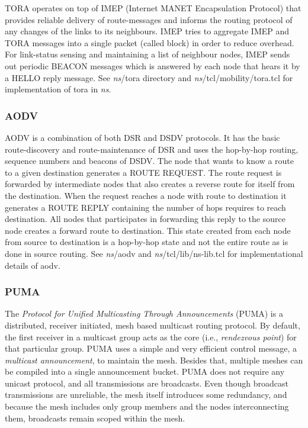 TORA operates on top of IMEP (Internet MANET Encapsulation Protocol) that
provides reliable delivery of route-messages and informs the routing
protocol of any changes of the links to its neighbours. IMEP tries to
aggregate IMEP and TORA messages into a single packet (called block) in
order to reduce overhead. For link-status sensing and maintaining a list
of neighbour nodes, IMEP sends out periodic BEACON messages which is
answered by each node that hears it by a HELLO reply message.
See \emph{ns}/tora directory and \emph{ns}/tcl/mobility/tora.tcl for implementation of
tora in \emph{ns}.

\subsubsection{AODV}
\label{sec:AODV}

AODV is a combination of both DSR and DSDV protocols. It has the basic
route-discovery and route-maintenance of DSR and uses the hop-by-hop
routing, sequence numbers and beacons of DSDV. The node that wants to know
a route to a given destination generates a ROUTE REQUEST. The route
request is forwarded by intermediate nodes that also creates a reverse
route for itself from the destination. When the request reaches a node
with route to destination it generates a ROUTE REPLY containing the number
of hops requires to reach destination. All nodes that participates in
forwarding this reply to the source node creates a forward route to
destination. This state created from each node from source to destination
is a hop-by-hop state and not the entire route as is done in source
routing.
See \emph{ns}/aodv and \emph{ns}/tcl/lib/ns-lib.tcl for implementational details
of aodv.

\subsubsection{PUMA}
\label{sec:PUMA}

The \emph{Protocol for Unified Multicasting Through Announcements} (PUMA) 
is a distributed, receiver initiated, mesh based multicast routing protocol. 
By default, the first receiver in a multicast group acts as the core (i.e., 
\emph{rendezvous point}) for that particular group. PUMA uses a simple and 
very efficient control message, a \textit{multicast announcement}, to 
maintain the mesh. Besides that, multiple meshes can be compiled into a 
single announcement bucket. PUMA does not require any unicast protocol, and
all transmissions are broadcasts. Even though broadcast transmissions are 
unreliable, the mesh itself introduces some redundancy, and because the mesh
includes only group members and the nodes interconnecting them, broadcasts
remain scoped within the mesh.

